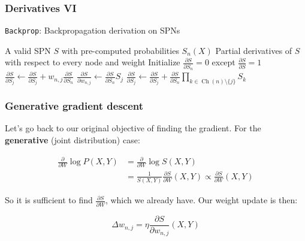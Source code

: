\documentclass{beamer}
\DeclareMathOperator*{\Ch}{\text{Ch}}
\newcommand{\ddspn}[2]{\frac{\partial#1}{\partial#2}}
\newcommand{\code}[1]{\lstinline[mathescape=true]{#1}}
\begin{document}
\begin{frame}
  \frametitle{Derivatives VI}

  \begin{algorithm}[H]
    \caption{\code{Backprop}: Backpropagation derivation on SPNs}
    \begin{algorithmic}[1]
      \Require A valid SPN $S$ with pre-computed probabilities $S_n(X)$
      \Ensure Partial derivatives of $S$ with respect to every node and weight
      \State Initialize $\ddspn{S}{S_n}=0$ except $\ddspn{S}{S}=1$
          \For{all $j\in\Ch(n)$}
            \State $\ddspn{S}{S_j}\gets\ddspn{S}{S_j}+w_{n,j}\ddspn{S}{S_n}$
            \State $\ddspn{S}{w_{n,j}}\gets\ddspn{S}{S_n}S_j$
          \EndFor%
        \Else%
          \For{all $j\in\Ch(n)$}
            \State $\ddspn{S}{S_j}\gets\ddspn{S}{S_j}+\ddspn{S}{S_n}\prod_{k\in\Ch(n)\setminus
              \{j\}}S_k$
          \EndFor%
        \EndIf
      \EndFor%
    \end{algorithmic}
  \end{algorithm}
\end{frame}

\begin{frame}
  \frametitle{Generative gradient descent}

  Let's go back to our original objective of finding the gradient. For the \textbf{generative}
  (joint distribution) case:

  \begin{align*}
    \ddspn{}{W}\log P(X,Y)&=\ddspn{}{W}\log S(X,Y)\\
                          &=\frac{1}{S(X,Y)}\ddspn{S}{W}(X,Y)\propto\ddspn{S}{W}(X,Y)
  \end{align*}

  So it is sufficient to find $\ddspn{S}{W}$, which we already have. Our weight update is then:

  \begin{equation*}
    \Delta w_{n,j}=\eta\ddspn{S}{w_{n,j}}(X,Y)
  \end{equation*}
\end{frame}
\end{document}
